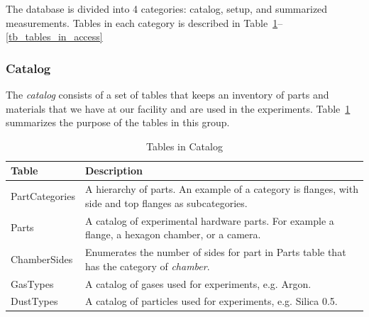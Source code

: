 




The database is divided into 4 categories: catalog, setup, and summarized measurements. Tables in each category is described in Table~\ref{tb_tables_in_catalog}--\ref{tb_tables_in_access} 


\subsubsection{Catalog}

The \emph{catalog} consists of a set of tables that keeps an inventory of parts and materials that we have at our facility and are used in the experiments. Table~\ref{tb_tables_in_catalog} summarizes the purpose of the tables in this group.

\begin{table}[h]
\centering
\caption{Tables in Catalog}\label{tb_tables_in_catalog}
\begin{tabular}{l p{12cm}} \hline
{\bf Table}         & {\bf Description}\\ \hline
PartCategories  & A hierarchy of parts. An example of a category is flanges, with side and top flanges as subcategories.\\ \hline
Parts           & A catalog of experimental hardware parts. For example a flange, a hexagon chamber, or a camera.\\ \hline
ChamberSides    & Enumerates the number of sides for part in Parts table that has the category of \emph{chamber}. \\ \hline
GasTypes        & A catalog of gases used for experiments, e.g. Argon. \\ \hline
DustTypes       & A catalog of particles used for experiments, e.g. Silica 0.5.\\ \hline
\end{tabular}
\end{table}


